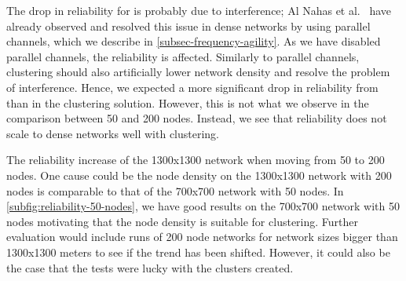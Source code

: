 The drop in reliability for \atwo{} is probably due to interference; Al Nahas et al.~\cite{a2-introduction-paper} have already observed and resolved this issue in dense networks by using parallel channels, which we describe in \cref{subsec-frequency-agility}. As we have disabled parallel channels, the reliability is affected. Similarly to parallel channels, clustering should also artificially lower network density and resolve the problem of interference. Hence, we expected a more significant drop in reliability from \atwo{} than in the clustering solution. However, this is not what we observe in the comparison between 50 and 200 nodes. Instead, we see that reliability does not scale to dense networks well with clustering. 

The reliability increase of the 1300x1300 network when moving from 50 to 200 nodes. One cause could be the node density on the 1300x1300 network with 200 nodes is comparable to that of the 700x700 network with 50 nodes. In \cref{subfig:reliability-50-nodes}, we have good results on the 700x700 network with 50 nodes motivating that the node density is suitable for clustering. Further evaluation would include runs of 200 node networks for network sizes bigger than 1300x1300 meters to see if the trend has been shifted. However, it could also be the case that the tests were lucky with the clusters created.

